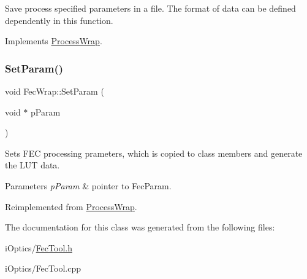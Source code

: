 Save process specified parameters in a file. The format of data can be defined dependently in this function. 

Implements \mbox{\hyperlink{class_process_wrap_aa5d4361a42a7a65cac877beb6d4ffa97}{Process\+Wrap}}.

\mbox{\label{class_fec_wrap_a989dbae7d3f292f4e686eee8f19a1ad7}} 
\subsubsection{\texorpdfstring{Set\+Param()}{SetParam()}}
{\footnotesize\ttfamily void Fec\+Wrap\+::\+Set\+Param (\begin{DoxyParamCaption}\item[{void $\ast$}]{p\+Param }\end{DoxyParamCaption})\hspace{0.3cm}{\ttfamily [virtual]}}

Sets F\+EC processing prameters, which is copied to class members and generate the L\+UT data. 
\begin{DoxyParams}{Parameters}
{\em p\+Param} & pointer to Fec\+Param. \\
\hline
\end{DoxyParams}


Reimplemented from \mbox{\hyperlink{class_process_wrap_a6c7130837d4713b0462f42cfc25aca98}{Process\+Wrap}}.



The documentation for this class was generated from the following files\+:\begin{DoxyCompactItemize}
\item 
i\+Optics/\mbox{\hyperlink{_fec_tool_8h}{Fec\+Tool.\+h}}\item 
i\+Optics/Fec\+Tool.\+cpp\end{DoxyCompactItemize}

